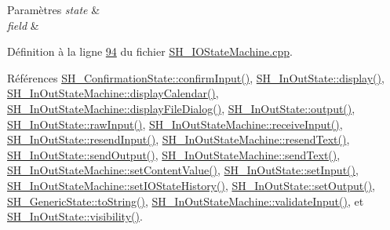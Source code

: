 \begin{DoxyParams}{Paramètres}
{\em state} & \\
\hline
{\em field} & \\
\hline
\end{DoxyParams}


Définition à la ligne \hyperlink{SH__IOStateMachine_8cpp_source_l00094}{94} du fichier \hyperlink{SH__IOStateMachine_8cpp_source}{S\-H\-\_\-\-I\-O\-State\-Machine.\-cpp}.



Références \hyperlink{classSH__ConfirmationState_a039267260de5d102ac7511e6a5fae87f}{S\-H\-\_\-\-Confirmation\-State\-::confirm\-Input()}, \hyperlink{classSH__InOutState_a616f88b20478b81b2927a9ddc2b4f521}{S\-H\-\_\-\-In\-Out\-State\-::display()}, \hyperlink{classSH__InOutStateMachine_ab3a12d1f9b658d8ffdc17669a6c065f2}{S\-H\-\_\-\-In\-Out\-State\-Machine\-::display\-Calendar()}, \hyperlink{classSH__InOutStateMachine_abd206c3bc32bb7690df9c3e1cd546ebc}{S\-H\-\_\-\-In\-Out\-State\-Machine\-::display\-File\-Dialog()}, \hyperlink{classSH__InOutState_a17ed7eaf5e3ed5af80a4f9fe65d5bfd9}{S\-H\-\_\-\-In\-Out\-State\-::output()}, \hyperlink{classSH__InOutState_a4c674a54f41d2e6ef951b22393dcd89f}{S\-H\-\_\-\-In\-Out\-State\-::raw\-Input()}, \hyperlink{classSH__InOutStateMachine_a037ed5e13ecfae2123a8d4940292e410}{S\-H\-\_\-\-In\-Out\-State\-Machine\-::receive\-Input()}, \hyperlink{classSH__InOutState_a1f00480afefd173002cf56d4c4128048}{S\-H\-\_\-\-In\-Out\-State\-::resend\-Input()}, \hyperlink{classSH__InOutStateMachine_a526822c66b46aa0cd81ba4473fa5573f}{S\-H\-\_\-\-In\-Out\-State\-Machine\-::resend\-Text()}, \hyperlink{classSH__InOutState_a77921c5f42059bc97361f4ff7827da12}{S\-H\-\_\-\-In\-Out\-State\-::send\-Output()}, \hyperlink{classSH__InOutStateMachine_a5e7f5958bae31696b6a8deab94ad2b4f}{S\-H\-\_\-\-In\-Out\-State\-Machine\-::send\-Text()}, \hyperlink{classSH__InOutStateMachine_a9ab1534306b2bdb62743d4bcefe40c17}{S\-H\-\_\-\-In\-Out\-State\-Machine\-::set\-Content\-Value()}, \hyperlink{classSH__InOutState_aaec9c2b5ef7c406bff7469461352d47c}{S\-H\-\_\-\-In\-Out\-State\-::set\-Input()}, \hyperlink{classSH__InOutStateMachine_acbcce2c4300af1634d928b30e5e9be1c}{S\-H\-\_\-\-In\-Out\-State\-Machine\-::set\-I\-O\-State\-History()}, \hyperlink{classSH__InOutState_af611c84134e262739cd834797b315c80}{S\-H\-\_\-\-In\-Out\-State\-::set\-Output()}, \hyperlink{classSH__GenericState_a7779babbb40f3f8faa71112204d9804f}{S\-H\-\_\-\-Generic\-State\-::to\-String()}, \hyperlink{classSH__InOutStateMachine_aec1b3fef3c1f82499aa1f73beaecd08a}{S\-H\-\_\-\-In\-Out\-State\-Machine\-::validate\-Input()}, et \hyperlink{classSH__InOutState_a3a18752c4122c26a2ebf38310c9c1b75}{S\-H\-\_\-\-In\-Out\-State\-::visibility()}.



